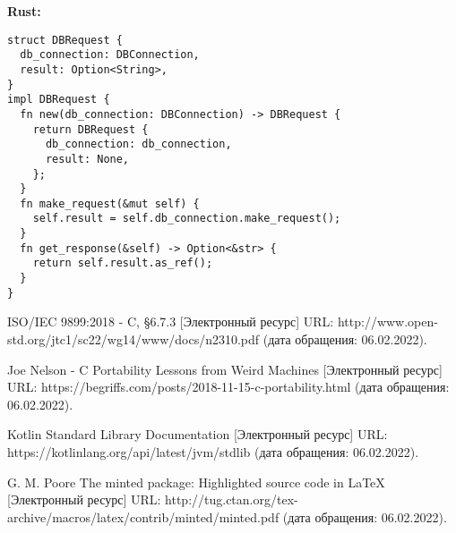 \documentclass[12p]{article}
\begin{document}
\textbf{Rust:}
\begin{verbatim}
struct DBRequest {
  db_connection: DBConnection,
  result: Option<String>,
}
impl DBRequest {
  fn new(db_connection: DBConnection) -> DBRequest {
    return DBRequest {
      db_connection: db_connection,
      result: None,
    };
  }
  fn make_request(&mut self) {
    self.result = self.db_connection.make_request();
  }
  fn get_response(&self) -> Option<&str> {
    return self.result.as_ref();
  }
}
\end{verbatim}

\begin{thebibliography}{}

ISO/IEC 9899:2018 - C, \S6.7.3 [Электронный ресурс] URL: http://www.open-std.org/jtc1/sc22/wg14/www/docs/n2310.pdf (дата обращения: 06.02.2022).

Joe Nelson - C Portability Lessons from Weird Machines [Электронный ресурс] URL: https://begriffs.com/posts/2018-11-15-c-portability.html (дата обращения: 06.02.2022).

Kotlin Standard Library Documentation [Электронный ресурс] URL: https://kotlinlang.org/api/latest/jvm/stdlib (дата обращения: 06.02.2022).

G. M. Poore The minted package: Highlighted source code in LaTeX [Электронный ресурс] URL: http://tug.ctan.org/tex-archive/macros/latex/contrib/minted/minted.pdf (дата обращения: 06.02.2022).

\end{thebibliography}
\end{document}
